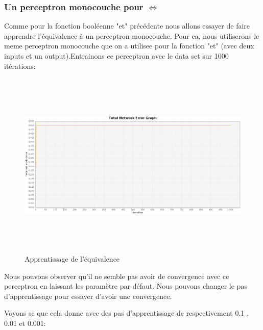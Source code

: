 \documentclass[twoside,openright,a4paper,11pt,french]{article}
\begin{document}
\subsubsection{Un perceptron monocouche pour $\Leftrightarrow$}

Comme pour la fonction booléenne "et" précédente nous allons essayer de faire
apprendre l'équivalence à un perceptron monocouche. Pour ca, nous utiliserons le meme
perceptron monocouche que on a utilisee pour la fonction "et" (avec deux inputs
et un output).Entrainons ce perceptron avec le data set sur 1000 itérations:

\begin{figure}
\centering
\includegraphics[width=12cm,height=9cm]{./pics/eq/mono_eq_def.eps}
\caption{Apprentissage de l'équivalence}
\end{figure}

Nous pouvons observer qu'il ne semble pas avoir de convergence avec ce
perceptron en laissant les paramètre par défaut. Nous pouvons changer le pas
d'apprentissage pour essayer d'avoir une convergence.

Voyons se que cela donne avec des pas d'apprentissage de respectivement 0.1 ,
0.01 et 0.001:
\end{document}
